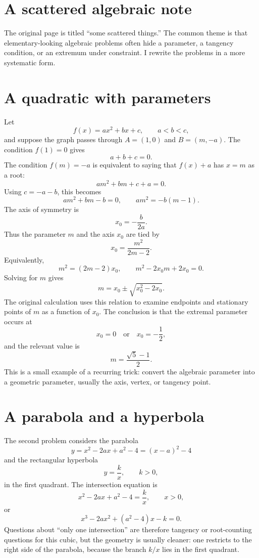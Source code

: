 
\section{A scattered algebraic note}

The original page is titled ``some scattered things.''  The common theme is that elementary-looking algebraic problems often hide a parameter, a tangency condition, or an extremum under constraint.  I rewrite the problems in a more systematic form.

\section{A quadratic with parameters}

Let
\[
  f(x)=ax^2+bx+c,\qquad a<b<c,
\]
and suppose the graph passes through \(A=(1,0)\) and \(B=(m,-a)\).  The condition \(f(1)=0\) gives
\[
  a+b+c=0.
\]
The condition \(f(m)=-a\) is equivalent to saying that \(f(x)+a\) has \(x=m\) as a root:
\[
  am^2+bm+c+a=0.
\]
Using \(c=-a-b\), this becomes
\[
  am^2+bm-b=0,\qquad am^2=-b(m-1).
\]
The axis of symmetry is
\[
  x_0=-\frac{b}{2a}.
\]
Thus the parameter \(m\) and the axis \(x_0\) are tied by
\[
  x_0=\frac{m^2}{2m-2}.
\]
Equivalently,
\[
  m^2=(2m-2)x_0,\qquad m^2-2x_0m+2x_0=0.
\]
Solving for \(m\) gives
\[
  m=x_0\pm\sqrt{x_0^2-2x_0}.
\]
The original calculation uses this relation to examine endpoints and stationary points of \(m\) as a function of \(x_0\).  The conclusion is that the extremal parameter occurs at
\[
  x_0=0\quad\text{or}\quad x_0=-\frac12,
\]
and the relevant value is
\[
  m=\frac{\sqrt5-1}{2}.
\]
This is a small example of a recurring trick: convert the algebraic parameter into a geometric parameter, usually the axis, vertex, or tangency point.

\section{A parabola and a hyperbola}

The second problem considers the parabola
\[
  y=x^2-2ax+a^2-4=(x-a)^2-4
\]
and the rectangular hyperbola
\[
  y=\frac{k}{x},\qquad k>0,
\]
in the first quadrant.  The intersection equation is
\[
  x^2-2ax+a^2-4=\frac{k}{x},\qquad x>0,
\]
or
\[
  x^3-2ax^2+(a^2-4)x-k=0.
\]
Questions about ``only one intersection'' are therefore tangency or root-counting questions for this cubic, but the geometry is usually cleaner: one restricts to the right side of the parabola, because the branch \(k/x\) lies in the first quadrant.

